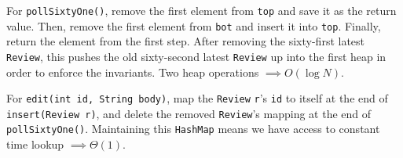 \begin{blocksection}
\begin{solution}[1.5in]
For \lstinline$pollSixtyOne()$, remove the first element from \lstinline$top$ and save it as the return value. Then, remove the first element from \lstinline$bot$ and insert it into \lstinline$top$. Finally, return the element from the first step. After removing the sixty-first latest \lstinline$Review$, this pushes the old sixty-second latest \lstinline$Review$ up into the first heap in order to enforce the invariants. Two heap operations $\implies O(\log N)$.

For \lstinline$edit(int id, String body)$, map the \lstinline$Review$ \lstinline$r$'s \lstinline$id$ to itself at the end of \lstinline$insert(Review r)$, and delete the removed \lstinline$Review$'s mapping at the end of \lstinline$pollSixtyOne()$. Maintaining this \lstinline$HashMap$ means we have access to constant time lookup $\implies \Theta(1)$.
\end{solution}
\end{blocksection}
